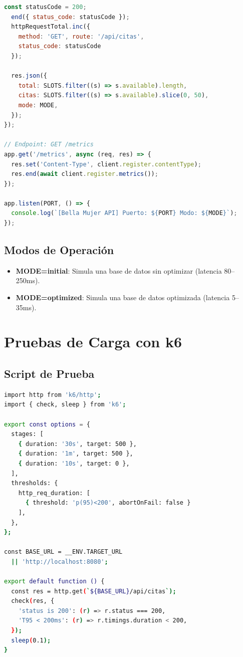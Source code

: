 \documentclass[12pt, a4paper]{article}
\begin{document}
\begin{lstlisting}[language=JavaScript, caption={server.js - API Express con métricas Prometheus}, label={lst:server}]
  const statusCode = 200;
  end({ status_code: statusCode });
  httpRequestTotal.inc({
    method: 'GET', route: '/api/citas',
    status_code: statusCode
  });

  res.json({
    total: SLOTS.filter((s) => s.available).length,
    citas: SLOTS.filter((s) => s.available).slice(0, 50),
    mode: MODE,
  });
});

// Endpoint: GET /metrics
app.get('/metrics', async (req, res) => {
  res.set('Content-Type', client.register.contentType);
  res.end(await client.register.metrics());
});

app.listen(PORT, () => {
  console.log(`[Bella Mujer API] Puerto: ${PORT} Modo: ${MODE}`);
});
\end{lstlisting}

\subsection{Modos de Operación}

\begin{itemize}
    \item \textbf{MODE=initial}: Simula una base de datos sin optimizar (latencia 80--250ms).
    \item \textbf{MODE=optimized}: Simula una base de datos optimizada (latencia 5--35ms).
\end{itemize}

\newpage

\section{Pruebas de Carga con k6}

\subsection{Script de Prueba}

\begin{lstlisting}[language=bash, caption={k6-test.js - Script de prueba de carga}]
import http from 'k6/http';
import { check, sleep } from 'k6';

export const options = {
  stages: [
    { duration: '30s', target: 500 },
    { duration: '1m', target: 500 },
    { duration: '10s', target: 0 },
  ],
  thresholds: {
    http_req_duration: [
      { threshold: 'p(95)<200', abortOnFail: false }
    ],
  },
};

const BASE_URL = __ENV.TARGET_URL
  || 'http://localhost:8080';

export default function () {
  const res = http.get(`${BASE_URL}/api/citas`);
  check(res, {
    'status is 200': (r) => r.status === 200,
    'T95 < 200ms': (r) => r.timings.duration < 200,
  });
  sleep(0.1);
}
\end{lstlisting}
\end{document}
